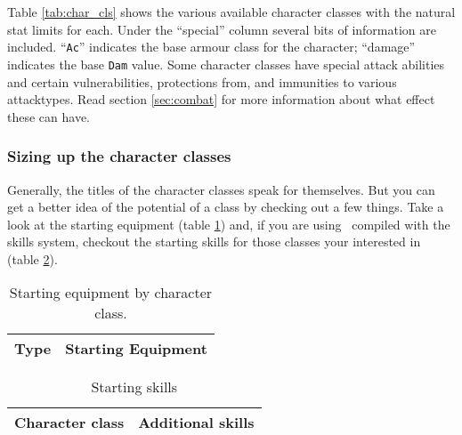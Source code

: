 Table \ref{tab:char_cls} shows the various available character classes with 
the natural stat limits for each. 
Under the ``special'' column several bits of information are included. ``{\tt Ac}''
 indicates the base armour class 
for the character; ``damage''
indicates the base {\tt Dam} value. 
Some character classes have special attack abilities and certain vulnerabilities, 
protections from, and immunities to various attacktypes. Read section 
\ref{sec:combat} for more information about what effect these can have.

\subsubsection{Sizing up the character classes}

Generally, the titles of the character classes speak for themselves. But 
you can get a better idea of the potential of a class by checking out a
few things. Take a look at the starting equipment 
(table \ref{tab:start_equip}) and, if you are using \cf\ compiled with 
the skills system, checkout the starting skills for those classes your interested 
in (table \ref{tab:skill_start}).


\begin{table}
\begin{center}
\scriptsize
\caption{Starting equipment by character class. \label{tab:start_equip}}
\vskip 12pt
\begin{tabular}{|l|l|} \hline
Type & Starting Equipment \\ \hline\hline

\hline
\end{tabular}
\end{center}
\end{table}

\begin{table}
\footnotesize
\caption{Starting skills} \label{tab:skill_start}
\vskip 12pt
\begin{center}
\begin{tabular}{|l|l|} \hline
Character class 	& Additional skills\tablenotemark{1} \\ \hline\hline

\hline
\end{tabular}
\end{center}
\end{table} 

